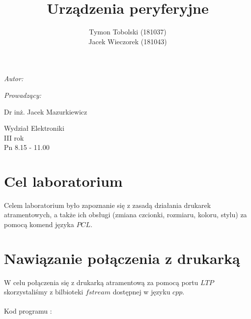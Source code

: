 \documentclass[wide,a4paper,titlepage,12pt] {article}
\title{Urządzenia peryferyjne}
\author{Tymon Tobolski (181037)\\ Jacek Wieczorek (181043)}
\makeatletter
\renewcommand{\maketitle}{
\begin{titlepage}
  \begin{center}
    \vspace*{3cm}
    \LARGE \@title \par
    \vspace{2cm}
    \textit{\small Autor:}\par
    \normalsize \@author\par \normalsize
    \vspace{3cm}
    \textit{\small Prowadzący:}\par
    Dr inż. Jacek Mazurkiewicz \par
    \vspace{2cm}
    Wydział Elektroniki\\ III rok\\ Pn 8.15 - 11.00\par
    \vspace{4cm}
    \small \@date
  \end{center}
\end{titlepage}
}
\makeatother
\begin{document}
\maketitle

\section{Cel laboratorium}
\paragraph{}
Celem laboratorium było zapoznanie się z zasadą działania drukarek atramentowych, a także ich obsługi (zmiana czcionki, rozmiaru, koloru, stylu) za pomocą komend języka $PCL$.

\section{Nawiązanie połączenia z drukarką}
\paragraph{}
W celu połączenia się z drukarką atramentową za pomocą portu $LTP$ skorzystaliśmy z bilbioteki $fstream$ dostępnej w języku $cpp$. \\\\
Kod programu : 
\lstset{ %
    language=c++,                %
    basicstyle=\scriptsize,       %
    numbers=left,                   %
    numberstyle=\scriptsize,      %
    stepnumber=10,                   %
    numbersep=9pt,                  %
    showspaces=false,               %
    showstringspaces=false,         %
    showtabs=false,                 %
    breaklines=true,                %
    }
    
\end{document}
